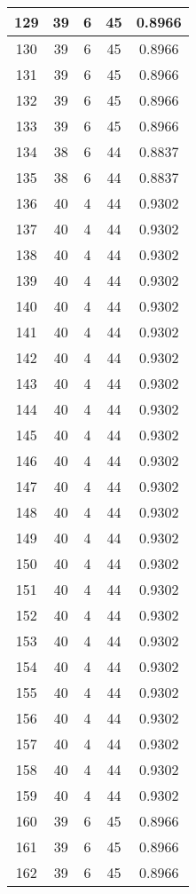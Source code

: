 \documentclass[letterpaper, 12pt]{article}
\begin{document}
\begin{longtable}{|c|c|c|c|c|}
\hline
129 & 39 & 6 & 45 & 0.8966 \\
\hline
130 & 39 & 6 & 45 & 0.8966 \\
\hline
131 & 39 & 6 & 45 & 0.8966 \\
\hline
132 & 39 & 6 & 45 & 0.8966 \\
\hline
133 & 39 & 6 & 45 & 0.8966 \\
\hline
134 & 38 & 6 & 44 & 0.8837 \\
\hline
135 & 38 & 6 & 44 & 0.8837 \\
\hline
136 & 40 & 4 & 44 & 0.9302 \\
\hline
137 & 40 & 4 & 44 & 0.9302 \\
\hline
138 & 40 & 4 & 44 & 0.9302 \\
\hline
139 & 40 & 4 & 44 & 0.9302 \\
\hline
140 & 40 & 4 & 44 & 0.9302 \\
\hline
141 & 40 & 4 & 44 & 0.9302 \\
\hline
142 & 40 & 4 & 44 & 0.9302 \\
\hline
143 & 40 & 4 & 44 & 0.9302 \\
\hline
144 & 40 & 4 & 44 & 0.9302 \\
\hline
145 & 40 & 4 & 44 & 0.9302 \\
\hline
146 & 40 & 4 & 44 & 0.9302 \\
\hline
147 & 40 & 4 & 44 & 0.9302 \\
\hline
148 & 40 & 4 & 44 & 0.9302 \\
\hline
149 & 40 & 4 & 44 & 0.9302 \\
\hline
150 & 40 & 4 & 44 & 0.9302 \\
\hline
151 & 40 & 4 & 44 & 0.9302 \\
\hline
152 & 40 & 4 & 44 & 0.9302 \\
\hline
153 & 40 & 4 & 44 & 0.9302 \\
\hline
154 & 40 & 4 & 44 & 0.9302 \\
\hline
155 & 40 & 4 & 44 & 0.9302 \\
\hline
156 & 40 & 4 & 44 & 0.9302 \\
\hline
157 & 40 & 4 & 44 & 0.9302 \\
\hline
158 & 40 & 4 & 44 & 0.9302 \\
\hline
159 & 40 & 4 & 44 & 0.9302 \\
\hline
160 & 39 & 6 & 45 & 0.8966 \\
\hline
161 & 39 & 6 & 45 & 0.8966 \\
\hline
162 & 39 & 6 & 45 & 0.8966 \\

\end{longtable}
\end{document}
